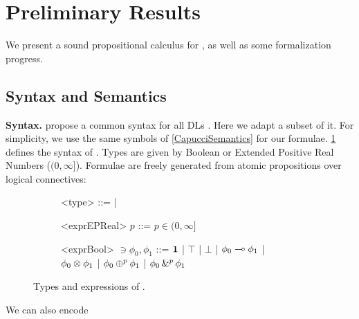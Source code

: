 \section{Preliminary Results} \label{section:CurrentApproach}

We present a sound propositional calculus for \OL{}, as well as some formalization progress.

\subsection{Syntax and Semantics}

\textbf{Syntax.}  \citeauthor{slusarz2023logic} propose a common syntax for all DLs \citep{slusarz2023logic}. Here we adapt a subset of it.  For simplicity, we use the same symbols of \cref{CapucciSemantics} for our formulae. \cref{fig:syntax} defines the syntax of \OL{}. Types are given by Boolean or  Extended Positive Real Numbers ($(0,\infty]$). Formulae are freely generated from atomic propositions over logical connectives:\\

\begin{figure}[H]
\begin{subfigure}[t]{0.4\textwidth}
	\begin{grammar}
		<type> ::=  
        \BoolType | \ERealType 

        
	\end{grammar}
\end{subfigure}
\hfill
\begin{subfigure}[t]{1\textwidth}
	\begin{grammar}
		<exprEPReal> $p$ ::=  
        $p \in (0, \infty]$ 
	\end{grammar}
\end{subfigure}
\begin{subfigure}[t]{1\textwidth}
	\begin{grammar}
		<exprBool> $\ni \phi_{0},\phi_{1}$ ::=  
        $\textbf{1}$ | $\top$ | $\bot$ | $\phi_{0} \multimap{} \phi_{1}$ | $\phi_{0} \otimes{} \phi_{1}$ | $\phi_{0} \oplus^{p} \phi_{1}$ | $\phi_{0} \,\&^{p}\, \phi_{1}$ 
	\end{grammar}
\end{subfigure}
\hfill
\setlength{\belowcaptionskip}{-20pt} 
	\caption{Types and expressions of \OL{}.\\
	}
	\label{fig:syntax}
\end{figure}
We can also encode 

